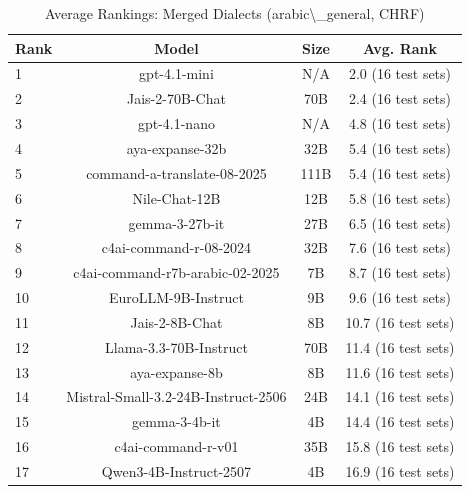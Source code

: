 \begin{table}[htbp]
\centering
\caption{Average Rankings: Merged Dialects (arabic\textbackslash{}_general, CHRF)}
\label{tab:avg_rankings_chrf_arabic_general}
\begin{tabular}{l@{\hspace{3pt}}c@{\hspace{3pt}}c@{\hspace{3pt}}c}
\toprule
Rank & Model & Size & Avg. Rank \\
\midrule
1 & gpt-4.1-mini & N/A & 2.0 (16 test sets) \\
2 & Jais-2-70B-Chat & 70B & 2.4 (16 test sets) \\
3 & gpt-4.1-nano & N/A & 4.8 (16 test sets) \\
4 & aya-expanse-32b & 32B & 5.4 (16 test sets) \\
5 & command-a-translate-08-2025 & 111B & 5.4 (16 test sets) \\
6 & Nile-Chat-12B & 12B & 5.8 (16 test sets) \\
7 & gemma-3-27b-it & 27B & 6.5 (16 test sets) \\
8 & c4ai-command-r-08-2024 & 32B & 7.6 (16 test sets) \\
9 & c4ai-command-r7b-arabic-02-2025 & 7B & 8.7 (16 test sets) \\
10 & EuroLLM-9B-Instruct & 9B & 9.6 (16 test sets) \\
11 & Jais-2-8B-Chat & 8B & 10.7 (16 test sets) \\
12 & Llama-3.3-70B-Instruct & 70B & 11.4 (16 test sets) \\
13 & aya-expanse-8b & 8B & 11.6 (16 test sets) \\
14 & Mistral-Small-3.2-24B-Instruct-2506 & 24B & 14.1 (16 test sets) \\
15 & gemma-3-4b-it & 4B & 14.4 (16 test sets) \\
16 & c4ai-command-r-v01 & 35B & 15.8 (16 test sets) \\
17 & Qwen3-4B-Instruct-2507 & 4B & 16.9 (16 test sets) \\
\bottomrule
\end{tabular}
\end{table}